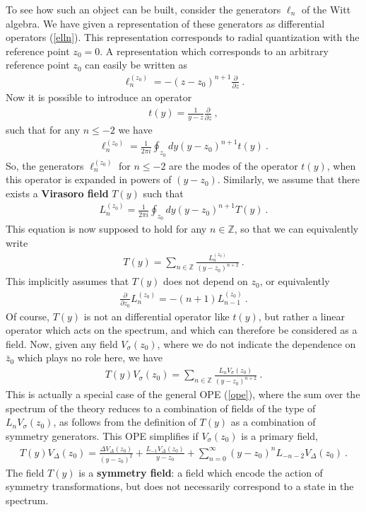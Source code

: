 \documentclass[12pt,a4paper,notitlepage]{report}
\newcommand \Z {\mathbb{Z}}
\newcommand \p {\partial}
\newcommand \pp[1] {{\frac{\p}{\p #1}}}
\numberwithin{equation}{section}
\theoremstyle{break}
\begin{document}
To see how such an object can be built, consider the generators $\ell_n$ of the Witt algebra. We have given a representation of these generators as differential operators (\ref{elln}). This representation corresponds to radial quantization with the reference point $z_0=0$. A representation which corresponds to an arbitrary reference point $z_0$ can easily be written as
\begin{align}
 \ell_n^{(z_0)} = -(z-z_0)^{n+1}\pp{z}\ .
\label{lzz}
\end{align}
Now it is possible to introduce an operator
\begin{align}
 t(y) = \frac{1}{y-z}\pp{z}\ ,
\end{align}
such that for any $n\leq -2$ we have
\begin{align}
 \ell_n^{(z_0)} = \frac{1}{2\pi i}\oint_{z_0} dy (y-z_0)^{n+1} t(y) \ .
\label{lnz}
\end{align}
So, the generators $\ell_n^{(z_0)}$ for $n\leq -2$ are the modes of the operator $t(y)$, when this operator is expanded in powers of $(y-z_0)$. 
Similarly, we assume that there exists a \textbf{\boldmath Virasoro field} $T(y)$ such that
\begin{align}
\boxed{ L_n^{(z_0)} = \frac{1}{2\pi i}\oint_{z_0} dy (y-z_0)^{n+1} T(y)} \ .
\label{lit}
\end{align}
This equation is now supposed to hold for any $n\in\Z$, so that we can equivalently write 
\begin{align}
 \boxed{T(y) = \sum_{n\in\Z} \frac{L_n^{(z_0)}}{(y-z_0)^{n+2}}}\ .
\label{tsl}
\end{align}
This implicitly assumes that $T(y)$ does not depend on $z_0$, or equivalently
\begin{align}
 \pp{z_0} L_{n}^{(z_0)} = -(n+1) L_{n-1}^{(z_0)}\ .
\label{pll}
\end{align}
Of course, $T(y)$ is not an differential operator like $t(y)$, but rather a linear operator which acts on the spectrum, and which can therefore be considered as a field. Now, given any field $V_\sigma(z_0)$, where we do not indicate the dependence on $\bar{z}_0$ which plays no role here, we have
\begin{align}
 \boxed{T(y)V_\sigma(z_0) = \sum_{n\in\Z} \frac{L_n V_\sigma(z_0)}{(y-z_0)^{n+2}}}\ .
\label{tv}
\end{align}
This is actually a special case of the general OPE (\ref{ope}), where the sum over the spectrum of the theory reduces to a combination of fields of the type of $L_n V_\sigma(z_0)$, as follows from the definition of $T(y)$ as a combination of symmetry generators. This OPE simplifies if $V_\sigma(z_0)$ is a primary field, 
\begin{align}
 T(y) V_\Delta(z_0) = \frac{\Delta V_\Delta(z_0)}{(y-z_0)^2} + \frac{L_{-1} V_\Delta(z_0)}{y-z_0} + \sum_{n=0}^\infty (y-z_0)^n L_{-n-2}V_\Delta(z_0)\ .
\label{tvp}
\end{align}
The field $T(y)$ is a \textbf{\boldmath symmetry field}: a field which encode the action of symmetry transformations, but does not necessarily correspond to a state in the spectrum. 
\end{document}
